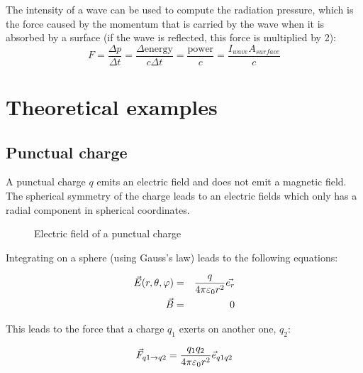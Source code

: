 \documentclass[a4paper,10pt]{article}
\newcommand{\vF}{\ensuremath\vec{F}} %
\newcommand{\vE}{\ensuremath\vec{E}} %
\newcommand{\vB}{\ensuremath\vec{B}} %
\begin{document}
The intensity of a wave can be used to compute the radiation pressure, which is the force caused by the momentum that is carried by the wave when it is absorbed by a surface (if the wave is reflected, this force is multiplied by 2):
\begin{equation}
  F = \frac{\Delta p}{\Delta t} = \frac{\Delta \text{energy}}{c \Delta t} = \frac{\text{power}}{c} =  \frac{I_{wave} A_{surface}}{c}
\end{equation}

\section{Theoretical examples}

\subsection{Punctual charge}

A punctual charge $q$ emits an electric field and does not emit a magnetic field.
The spherical symmetry of the charge leads to an electric fields which only has a radial component in spherical coordinates.

\begin{figure}[h]
  \centering
  \caption{Electric field of a punctual charge}
\end{figure}

Integrating on a sphere (using Gauss's law) leads to the following equations:

\begin{eqnarray}
  \vE(r, \theta, \varphi) &=& \frac{q}{4 \pi \varepsilon_0 r^2} \vec{e_r} \\
  \vB &=& 0
\end{eqnarray}

This leads to the force that a charge $q_1$ exerts on another one, $q_2$:

\begin{equation}
  \vF_{q1 \rightarrow q2} = \frac{q_1 q_2}{4 \pi \varepsilon_0 r^2} \vec{e}_{q1q2}
\end{equation}
\end{document}
